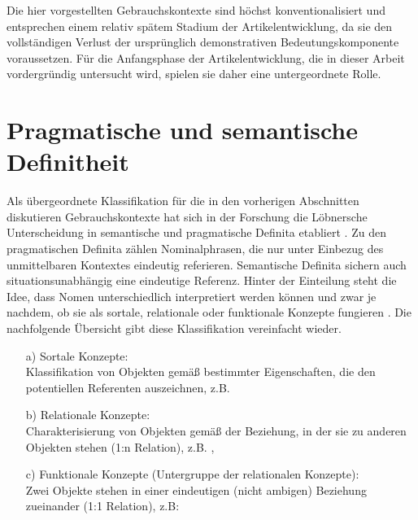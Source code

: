 \begin{exe}
	\ex \label{ex:sprichwort}   
	\begin{xlist}
		\ex \label{ex:zeilen}  
		\ex \label{ex:fest}  
		\end{xlist}
\end{exe}

Die hier vorgestellten Gebrauchskontexte sind höchst konventionalisiert und entsprechen einem relativ spätem Stadium der Artikelentwicklung, da sie den vollständigen Verlust der ursprünglich demonstrativen Bedeutungskomponente voraussetzen. Für die Anfangsphase der Artikelentwicklung, die in dieser Arbeit vordergründig untersucht wird, spielen sie daher eine untergeordnete Rolle.


\section{Pragmatische und semantische Definitheit}\label{sec:pragsem}

Als übergeordnete Klassifikation für die in den vorherigen Abschnitten diskutieren Gebrauchskontexte hat sich in der Forschung die Löbnersche Unterscheidung in semantische und pragmatische Definita \parencite{Lobner1985} etabliert \parencite{Himmelmann1997, Demske2001,Nubling2005,Napoli2009,Szczepaniak2011a}. Zu den pragmatischen Definita zählen Nominalphrasen, die nur unter Einbezug des unmittelbaren Kontextes eindeutig referieren. Semantische Definita sichern auch situationsunabhängig eine eindeutige Referenz. Hinter der Einteilung steht die Idee, dass Nomen unterschiedlich interpretiert werden können und zwar je nachdem, ob sie als sortale, relationale oder funktionale Konzepte fungieren \parencite{Lobner1985,Lobner1998}. Die nachfolgende Übersicht gibt diese Klassifikation vereinfacht wieder. 

\begin{itemize} 
		\item[a)] \label{sort} Sortale Konzepte: \\ Klassifikation von Objekten gemäß bestimmter Eigenschaften, die den potentiellen Referenten auszeichnen, z.B.  
		\item[b)] \label{relat} Relationale Konzepte: \\  Charakterisierung von Objekten gemäß der Beziehung, in der sie zu anderen Objekten stehen (1:n Relation), z.B. ,  
		\item[c)] \label{funkt} Funktionale Konzepte (Untergruppe der relationalen Konzepte): \\  Zwei Objekte stehen in einer eindeutigen (nicht ambigen) Beziehung zueinander (1:1 Relation), z.B:  
\end{itemize} 

